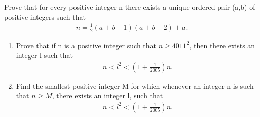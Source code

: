 \item Prove that for every positive integer n there exists a unique ordered pair (a,b) of positive integers such that
\begin{align*}
n = \frac{1}{2}(a + b - 1)(a + b - 2) + a.
\end{align*}

\item 
\begin{enumerate}
\item Prove that if n is a positive integer such that $n \geq 4011^{2}$, then there exists an integer l such that 
\begin{align*}
n < l^{2} < (1 + \frac{1}{2005})n.
\end{align*}
\item Find the smallest positive integer M for which whenever an integer n is such that $n \geq M$, there exists an integer l, such that 
\begin{align*}
n < l^{2} < (1 + \frac{1}{2005})n.
\end{align*}
\end{enumerate}


















